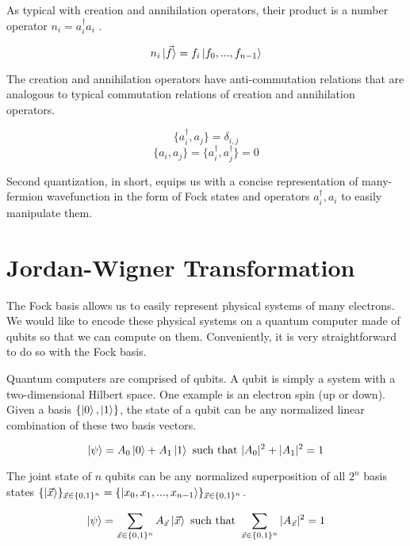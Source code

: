 As typical with creation and annihilation operators, their product is a number operator $n_i = a^\dag_ia_i$ \cite{QCC}.

\begin{equation}
    n_i\ket{\vec{f}} = f_i\ket{f_0, ..., f_{n - 1}}
\end{equation}

The creation and annihilation operators have anti-commutation relations \cite{QCC} that are analogous to typical commutation relations of creation and annihilation operators.

\begin{equation}
    \{a^\dag_i, a_j\} = \delta_{i, j}
\end{equation}
\begin{equation}
    \{a_i, a_j\} = \{a^\dag_i, a^\dag_j\} = 0
\end{equation}

Second quantization, in short, equips us with a concise representation of many-fermion wavefunction in the form of Fock states and operators $a^\dag_i, a_i$ to easily manipulate them.

\section{Jordan-Wigner Transformation}

The Fock basis allows us to easily represent physical systems of many electrons. We would like to encode these physical systems on a quantum computer made of qubits so that we can compute on them. Conveniently, it is very straightforward to do so with the Fock basis.

Quantum computers are comprised of qubits. A qubit is simply a system with a two-dimensional Hilbert space. One example is an electron spin (up or down). Given a basis $\{\ket{0}, \ket{1}\}$, the state of a qubit can be any normalized linear combination of these two basis vectors.

\begin{equation}
    \ket{\psi} = A_0\ket{0} + A_1\ket{1} \text{ such that } |A_0|^2 + |A_1|^2 = 1
\end{equation}

The joint state of $n$ qubits can be any normalized superposition of all $2^n$ basis states $\{\ket{\vec{x}}\}_{\vec{x} \in \{0, 1\}^n} = \{\ket{x_0, x_1, ..., x_{n - 1}}\}_{\vec{x} \in \{0, 1\}^n}$.

\begin{equation}
    \ket{\psi} = \sum_{\vec{x} \in \{0, 1\}^n} A_{\vec{x}} \ket{\vec{x}} \text{ such that } \sum_{\vec{x} \in \{0, 1\}^n} |A_{\vec{x}}|^2 = 1 \label{eq: qubits}
\end{equation}


